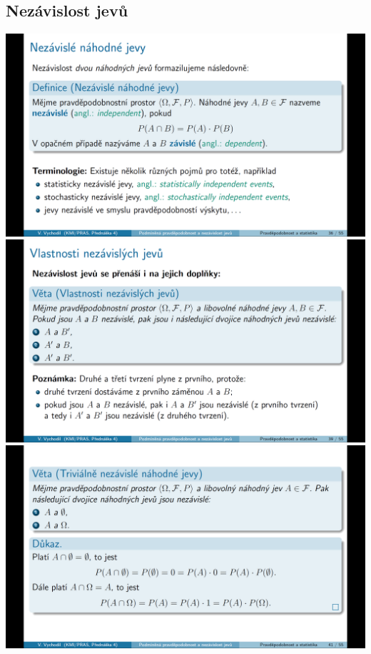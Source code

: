 \documentclass[12pt,a4paper]{article}
\begin{document}
\subsection{Nezávislost jevů}
\begin{center}
	\includegraphics[scale=0.32]{img/nezavisle_nahod_jevy}
	\includegraphics[scale=0.32]{img/nezavisle_nahod_jevy_properties}
	\includegraphics[scale=0.32]{img/nezavisle_nahod_jevy_trivialni}
\end{center}
\newpage
\end{document}
